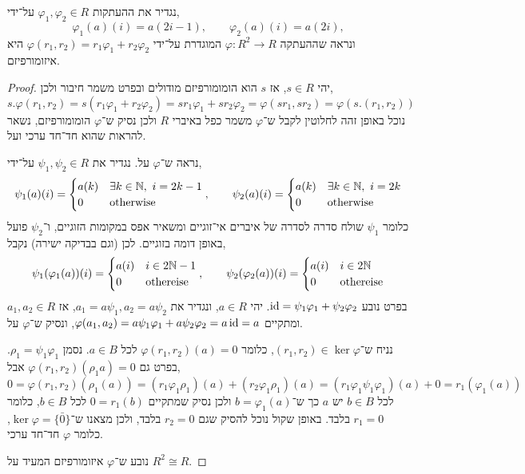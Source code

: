 \subquestion{}
נגדיר את ההעתקות $\varphi_1, \varphi_2 \in R$ על־ידי,
\[
	\varphi_1(a)(i) = a(2 i - 1),
	\qquad
	\varphi_2(a)(i) = a(2 i),
\]
ונראה שההעתקה $\varphi : R^2 \to R$ המוגדרת על־ידי $\varphi(r_1, r_2) = r_1 \varphi_1 + r_2 \varphi_2$ היא איזומורפיזם.
\begin{proof}
	יהי $s \in R$, אז $s$ הוא הומומורפיזם מודולים ובפרט משמר חיבור ולכן,
	\[
		s . \varphi(r_1, r_2)
		= s (r_1 \varphi_1 + r_2 \varphi_2)
		= s r_1 \varphi_1 + s r_2 \varphi_2
		= \varphi(s r_1, s r_2)
		= \varphi(s . (r_1, r_2))
	\]
	נוכל באופן זהה לחלוטין לקבל ש־$\varphi$ משמר כפל באיברי $R$ ולכן נסיק ש־$\varphi$ הומומורפיזם, נשאר להראות שהוא חד־חד ערכי ועל.

	נראה ש־$\varphi$ על.
	נגדיר את $\psi_1, \psi_2 \in R$ על־ידי,
	\[
		\psi_1(a)(i) = \begin{cases}
			a(k) & \exists k \in \mathbb{N},\ i = 2 k - 1 \\
			0 & \text{otherwise}
		\end{cases},
		\qquad
		\psi_2(a)(i) = \begin{cases}
			a(k) & \exists k \in \mathbb{N},\ i = 2 k \\
			0 & \text{otherwise}
		\end{cases}
	\]
	כלומר $\psi_1$ שולח סדרה לסדרה של איברים אי־זוגיים ומשאיר אפס במקומות הזוגיים, ו־$\psi_2$ פועל באופן דומה בזוגיים.
	לכן (וגם בבדיקה ישירה) נקבל,
	\[
		\psi_1(\varphi_1(a))(i)
		= \begin{cases}
			a(i) & i \in 2 \mathbb{N} - 1 \\
			0 & \text{othereise}
		\end{cases},
		\qquad
		\psi_2(\varphi_2(a))(i)
		= \begin{cases}
			a(i) & i \in 2 \mathbb{N} \\
			0 & \text{othereise}
		\end{cases}
	\]
	בפרט נובע $\operatorname{id} = \psi_1 \varphi_1 + \psi_2 \varphi_2$.
	יהי $a \in R$, ונגדיר את $a_1 = a \psi_1, a_2 = a \psi_2$, אז $a_1, a_2 \in R$ ומתקיים $\varphi(a_1, a_2) = a \psi_1 \varphi_1 + a \psi_2 \varphi_2 = a \operatorname{id} = a$, ונסיק ש־$\varphi$ על.

	נניח ש־$(r_1, r_2) \in \ker \varphi$, כלומר $\varphi(r_1, r_2)(a) = 0$ לכל $a \in B$.
	נסמן $\rho_1 = \psi_1 \varphi_1$.
	בפרט גם $\varphi(r_1, r_2)(\rho_1 a) = 0$ אבל,
	\[
		0
		= \varphi(r_1, r_2)(\rho_1(a))
		= (r_1 \varphi_1 \rho_1)(a) + (r_2 \varphi_1 \rho_1)(a)
		= (r_1 \varphi_1 \psi_1 \varphi_1)(a) + 0
		= r_1(\varphi_1(a))
	\]
	לכל $b \in B$ יש $a$ כך ש־$b = \varphi_1(a)$ ולכן נסיק שמתקיים $0 = r_1(b)$ לכל $b \in B$, כלומר $r_1 = 0$ בלבד.
	באופן שקול נוכל להסיק שגם $r_2 = 0$ בלבד, ולכן מצאנו ש־$\ker \varphi = \{ \bar{0} \}$, כלומר $\varphi$ חד־חד ערכי.

	נובע ש־$\varphi$ איזומורפיזם המעיד על $R^2 \cong R$.
\end{proof}

